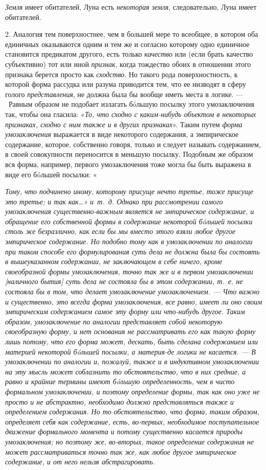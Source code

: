 \documentclass[twoside]{article}
\begin{document}
{{{{{{\em Земля} имеет обитателей,
Луна есть {\em некоторая земля},
следовательно, Луна имеет обитателей.

2. Аналогия тем поверхностнее, чем в большей мере то всеобщее,
в котором оба единичных оказываются одним и тем же и согласно которому одно
единичное становится предикатом другого, есть только
{\em качество} или (если
брать качество субъективно) тот или иной
{\em признак}, когда
тождество обоих в отношении этого признака берется просто как
{\em сходство}. Но такого
рода поверхностность, к которой форма рассудка или разума приводится тем,
что ее низводят в сферу голого
{\em представления}, не
должна была бы вообще иметь места в логике. — \ Равным
образом не подобает излагать бóльшую посылку этого умозаключения так, чтобы
она гласила: «{\em То, что сходно с
каким-нибудь объектом в некоторых признаках, сходно с ним также и в других
признаках}». Таким путем
{\em форма умозаключения}
выражается в виде некоторого содержания, а эмпирическое
содержание, которое, собственно говоря, только и следует называть
содержанием, в своей совокупности переносится в меньшую посылку. Подобным
же образом вся форма, например, первого умозаключения тоже могла бы быть
выражена в виде его бóльшей посылки:
«{\em Тому, что подчинено иному, которому присуще нечто третье, 
тоже присуще это третье; и так как…» и~т.~д. Однако при рассмотрении самого
умозаключения существенно-важным является не эмпирическое содержание, и
обращение его собственной формы в содержание некоторой бóльшей посылки
столь же безразлично, как если бы мы вместо этого взяли
любое другое эмпирическое содержание. Но подобно тому как в умозаключении
по аналогии при таком способе его формулирования суть дела не должна была
бы состоять в вышеуказанном содержании, не заключающем в себе ничего, кроме
своеобразной формы умозаключения, точно так же и в первом умозаключении
[наличного бытия] суть дела не состояла бы в этом содержании, т.~е. не
состояла бы в том, что делает умозаключение умозаключением. —
Что важно и существенно, это всегда форма умозаключения, все
равно, имеет ли оно своим эмпирическим содержанием самое эту форму или
что-нибудь другое. Таким образом, умозаключение по аналогии представляет
собой некоторую своеобразную форму, и нет основания не рассматривать его
как такую форму лишь потому, что его форма может, дескать, быть сделана
содержанием или материей некоторой бóльшей посылки, а материя-де логики не
касается. — В умозаключении по аналогии и, пожалуй, также и
в индуктивном умозаключении на эту мысль может соблазнить то
обстоятельство, что в них средние, а равно и крайние термины имеют бóльшую
определенность, чем в чисто формальном умозаключении, и поэтому определение
формы, так как оно уже не просто и не абстрактно, необходимо должно
представляться также и {\em определением
содержания}. Но то обстоятельство, что форма, таким образом,
определяет себя как содержание, есть, во-первых, необходимое поступательное
движение формального момента и потому существенно касается природы
умозаключения; но поэтому же,
{\em во-вторых}, такое
определение содержания не может рассматриваться точно так же, как любое
другое эмпирическое содержание, и от него нельзя абстрагировать.

}}}}}}
\end{document}
